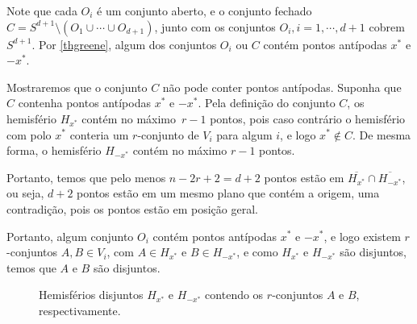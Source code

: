 Note que cada $O_i$ é um conjunto aberto, e o conjunto fechado $C = S^{d+1}\setminus (O_1\cup \cdots \cup O_{d+1})$, junto com os conjuntos $O_i, i=1,\cdots,d+1$ cobrem $S^{d+1}$. Por \ref{thgreene}, algum dos conjuntos $O_i$ ou $C$ contém pontos antípodas $x^*$ e $-x^*$.

Mostraremos que o conjunto $C$ não pode conter pontos antípodas. Suponha que $C$ contenha pontos antípodas $x^*$ e $-x^*$. Pela definição do conjunto $C$, os hemisfério $H_{x^*}$ contém no máximo~$r-1$ pontos, pois caso contrário o hemisfério com polo $x^*$ conteria um $r$-conjunto de $V_i$ para algum $i$, e logo $x^* \not\in C$. De mesma forma, o hemisfério $H_{-x^*}$ contém no máximo $r-1$ pontos.

Portanto, temos que pelo menos $n - 2r + 2 = d+2$ pontos estão em $\overline{H_{x^*}}\cap\overline{H_{-x^*}}$, ou seja, $d+2$ pontos estão em um mesmo plano que contém a origem, uma contradição, pois os pontos estão em posição geral.

Portanto, algum conjunto $O_i$ contém pontos antípodas $x^*$ e $-x^*$, e logo existem $r$-conjuntos $A,B \in V_i$, com $A\in H_{x^*}$ e $B\in H_{-x^*}$, e como $H_{x^*}$ e $H_{-x^*}$ são disjuntos, temos que $A$ e $B$ são disjuntos.

\begin{figure}[H]
\centering
{}
\caption{Hemisférios disjuntos $H_{x^*}$ e $H_{-x^*}$ contendo os $r$-conjuntos $A$ e $B$, respectivamente.}
\label{fig:knesersphereAB}
\end{figure}

